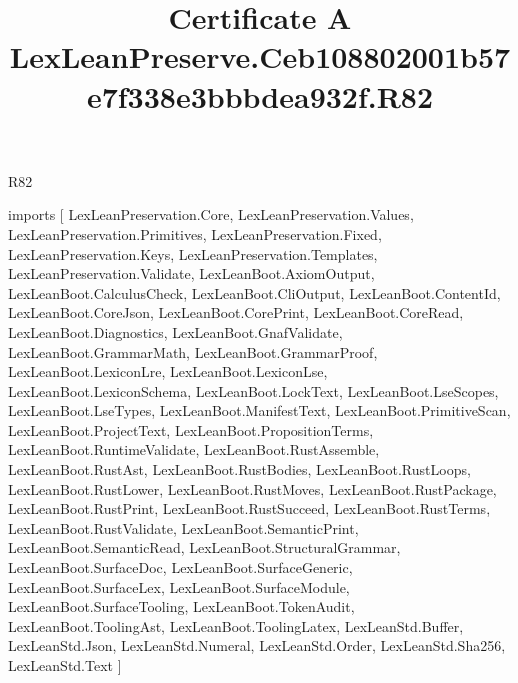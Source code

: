 \begin{lexlean}{R82}
\title{Certificate A LexLeanPreserve.Ceb108802001b57e7f338e3bbbdea932f.R82}
\begin{coremodule}
imports [
  LexLeanPreservation.Core,
  LexLeanPreservation.Values,
  LexLeanPreservation.Primitives,
  LexLeanPreservation.Fixed,
  LexLeanPreservation.Keys,
  LexLeanPreservation.Templates,
  LexLeanPreservation.Validate,
  LexLeanBoot.AxiomOutput,
  LexLeanBoot.CalculusCheck,
  LexLeanBoot.CliOutput,
  LexLeanBoot.ContentId,
  LexLeanBoot.CoreJson,
  LexLeanBoot.CorePrint,
  LexLeanBoot.CoreRead,
  LexLeanBoot.Diagnostics,
  LexLeanBoot.GnafValidate,
  LexLeanBoot.GrammarMath,
  LexLeanBoot.GrammarProof,
  LexLeanBoot.LexiconLre,
  LexLeanBoot.LexiconLse,
  LexLeanBoot.LexiconSchema,
  LexLeanBoot.LockText,
  LexLeanBoot.LseScopes,
  LexLeanBoot.LseTypes,
  LexLeanBoot.ManifestText,
  LexLeanBoot.PrimitiveScan,
  LexLeanBoot.ProjectText,
  LexLeanBoot.PropositionTerms,
  LexLeanBoot.RuntimeValidate,
  LexLeanBoot.RustAssemble,
  LexLeanBoot.RustAst,
  LexLeanBoot.RustBodies,
  LexLeanBoot.RustLoops,
  LexLeanBoot.RustLower,
  LexLeanBoot.RustMoves,
  LexLeanBoot.RustPackage,
  LexLeanBoot.RustPrint,
  LexLeanBoot.RustSucceed,
  LexLeanBoot.RustTerms,
  LexLeanBoot.RustValidate,
  LexLeanBoot.SemanticPrint,
  LexLeanBoot.SemanticRead,
  LexLeanBoot.StructuralGrammar,
  LexLeanBoot.SurfaceDoc,
  LexLeanBoot.SurfaceGeneric,
  LexLeanBoot.SurfaceLex,
  LexLeanBoot.SurfaceModule,
  LexLeanBoot.SurfaceTooling,
  LexLeanBoot.TokenAudit,
  LexLeanBoot.ToolingAst,
  LexLeanBoot.ToolingLatex,
  LexLeanStd.Buffer,
  LexLeanStd.Json,
  LexLeanStd.Numeral,
  LexLeanStd.Order,
  LexLeanStd.Sha256,
  LexLeanStd.Text
]


\end{coremodule}
\end{lexlean}
